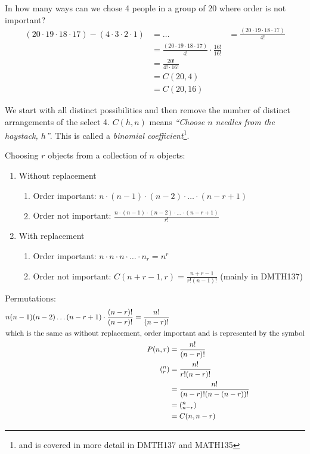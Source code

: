In how many ways can we chose 4 people in a group of 20 where order is not
important?
\begin{align}
  (20 \cdot 19 \cdot 18 \cdot 17) - (4 \cdot 3 \cdot 2 \cdot 1) &= \ldots
    &= \frac{(20 \cdot 19 \cdot 18 \cdot 17)}{4!} \\
    &= \frac{(20 \cdot 19 \cdot 18 \cdot 17)}{4!} \cdot \frac{16!}{16!} \\
    &= \frac{20!}{4! \cdot 16!} \\
    &= C(20,4) \\
    &= C(20,16)
\end{align}

We start with all distinct possibilities and then remove the number of distinct
arrangements of the select 4. $C(h,n)$ means \emph{``Choose $n$ needles from
the haystack, $h$''}. This is called a \emph{binomial coefficient}\footnote{and
is covered in more detail in DMTH137 and MATH135}.

Choosing $r$ objects from a collection of $n$ objects:
\begin{enumerate}
  \item Without replacement
  \begin{enumerate}
    \item Order important: $n \cdot (n-1) \cdot (n-2)\cdot \ldots \cdot (n-r+1) $
    \item Order not important: $\frac{n \cdot (n-1) \cdot (n-2)\cdot \ldots \cdot (n-r+1)}{r!}$
  \end{enumerate}
  \item With replacement
  \begin{enumerate}
    \item Order important: $n \cdot n \cdot n \cdot \ldots \cdot n_r = n^r $
    \item Order not important: $C(n+r-1, r) = \frac{n+r-1}{r!(n-1)!}$ (mainly in DMTH137)
  \end{enumerate}
\end{enumerate}

Permutations:
\begin{align}
  n(n-1)(n-2)\ldots(n-r+1)\cdot\frac{(n-r)!}{(n-r)!} = \frac{n!}{(n-r)!} \\
\intertext{which is the same as without replacement, order important and is 
represented by the symbol}
 P(n,r) &= \frac{n!}{(n-r)!} \\
 (_r^n) &= \frac{n!}{r!(n-r)!} \\
 &= \frac{n!}{(n-r)!(n-(n-r))!} \\
 &= (_{n-r}^n) \\
 &= C(n,n-r)
\end{align}